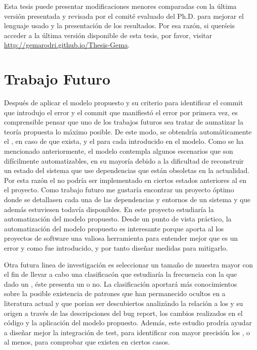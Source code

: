 \documentclass[a4paper, 12pt]{book}
\begin{document}

Esta tesis puede presentar modificaciones menores comparadas con la \'ultima versi\'on presentada y revisada por el comit\'e evaluado del Ph.D. para mejorar el lenguaje usado y la presentaci\'on de los resultados. Por esa raz\'on, si quer\'seis acceder a la \'ultima versi\'on disponible de esta tesis, por favor, visitar \url{http://gemarodri.github.io/Thesis-Gema}.

\section{Trabajo Futuro}
\label{sec:trabajoFuturo}

Despu\'es de aplicar el modelo propuesto y su criterio para identificar el commit que introdujo el error y el commit que manifiest\'o el error por primera vez, es comprensible pensar que uno de los trabajos futuros sea tratar de aumatizar la teor\'ia propuesta lo m\'aximo posible. De este modo, se obtendr\'ia autom\'aticamente el \BIC, en caso de que exista, y el \FFC para cada  \BFC introducido en el modelo. Como se ha mencionado anteriormente, el modelo contempla algunos escenarios que son dif\'icilmente automatizables, en su mayor\'ia debido a la dificultad de reconstruir un estado del sistema que use dependencias que est\'an obsoletas en la actualidad. Por esta raz\'on el \TSB no podr\'ia ser implementado en ciertos estados anteriores al \BFC en el proyecto. Como trabajo futuro me gustar\'ia encontrar un proyecto \'optimo donde se detallasen cada una de las dependencias y entornos de un sistema y que adem\'as estuviesen todav\'ia disponibles. En este proyecto estudiar\'ia la automatizaci\'on del modelo propuesto. Desde un punto de vista pr\'actico, la automatizaci\'on del modelo propuesto es interesante porque aporta al los proyectos de software una valiosa herramienta para entender mejor que es un error y como fue introducido, y por tanto dise\~nar medidas para mitigarlo.

Otra futura linea de investigaci\'on es seleccionar un tama\~no de muestra mayor con el fin de llevar a cabo una clasificac\'on que estudiar\'ia la frecuencia con la que dado un \BFC, \'este presenta un \BIC o no. La clasificaci\'on aportar\'a m\'as conocimientos sobre la posible existencia de patrones que han permanecido ocultos en a literatura actual y que por\'ian ser descubiertos analiz\'ando la relaci\'on a los \BFC y su origen a trav\'es de las descripciones del bug report, los cambios realizados en el c\'odigo y la aplicaci\'on del modelo propuesto. Adem\'as, este estudio prodr\'ia ayudar a dise\~nar mejor la integraci\'on de test, para identificar con mayor precisi\'on los \BIC, o al menos, para comprobar que existen en ciertos casos.
\end{document}
